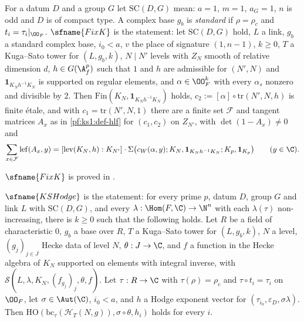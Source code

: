 \begin{definition}\label{pf:ks1:def-fixk}
For a datum $D$ and a group $G$ let $\mathrm{SC}(D,G)$ mean: $a=1$, $m=1$, $a_G=1$, $n$ is odd and $D$ is of compact type. A
complex base $g_b$ is \emph{standard} if $\rho=\rho_c$ and $t_i=\tau_i|_{\OO_F}$. $\sfname{FixK}$ is the statement: let
$\mathrm{SC}(D,G)$ hold, $L$ a link, $g_b$ a standard complex base, $i_0<a$, $v$ the place of signature $(1,n-1)$, $k\ge0$, $T$
a Kuga--Sato tower for $(L,g_b,k)$, $N\mid N'$ levels with $Z_N$ smooth of relative dimension $d$, $h\in G(\ksoneAfp)$ such
that $1$ and $h$ are admissible for $(N',N)$ and $\mathbf 1_{K_Nh^{-1}K_N}$ is supported on regular elements, and
$\alpha\in\OO_F^k$ with every $\alpha_s$ nonzero and divisible by $2$. Then $\mathrm{Fin}(K_N,\mathbf 1_{K_Nh^{-1}K_N})$
holds, $c_2:=[\alpha]\circ\mathrm{tr}(N',N,h)$ is finite \'etale, and with $c_1=\mathrm{tr}(N',N,1)$ there are a finite
set $\mathcal F$ and tangent matrices $A_x$ as in \cref{pf:ks1:def-hlf} for $(c_1,c_2)$ on $Z_{N'}$, with
$\det(1-A_x)\neq0$ and
\begin{equation}\label{pf:ks1:eq-fixk}
\sum_{x\in\mathcal F}\mathrm{lef}(A_x,y)=[\mathrm{lev}(K_N,h):K_{N'}]\cdot\Sigma\bigl(c_W(\alpha,y);K_N,\mathbf 1_{K_Nh^{-1}K_N};K_p,\mathbf 1_{K_p}\bigr)
\qquad(y\in\C).
\end{equation}
\end{definition}

$\sfname{FixK}$ is proved in .

\begin{definition}\label{pf:ks1:def-kshodge}
$\sfname{KSHodge}$ is the statement: for every prime $p$, datum $D$, group $G$ and link $L$ with $\mathrm{SC}(D,G)$, and every
$\lambda:\Hom(F,\C)\to\N^n$ with each $\lambda(\tau)$ non-increasing, there is $k\ge0$ such that the following holds. Let $R$ be a
field of characteristic $0$, $g_b$ a base over $R$, $T$ a Kuga--Sato tower for $(L,g_b,k)$, $N$ a level, $(g_j)_{j\in J}$ Hecke data
of level $N$, $\theta:J\to\C$, and $f$ a function in the Hecke algebra of $K_N$ supported on elements with integral inverse, with
$\mathcal S(L,\lambda,K_N,(f_{g_j})_j,\theta,f)$. Let $\tau:R\to\C$ with $\tau(\rho)=\rho_c$ and $\tau\circ t_i=\tau_i$ on $\OO_F$,
let $\sigma\in\Aut(\C)$, $i_0<a$, and $h$ a Hodge exponent vector for $(\tau_{i_0},\varepsilon_D,\sigma\lambda)$. Then
$\mathrm{HO}(\mathrm{bc}_\tau(\mathcal H_T(N,g)),\sigma\circ\theta,h_i)$ holds for every $i$.
\end{definition}

